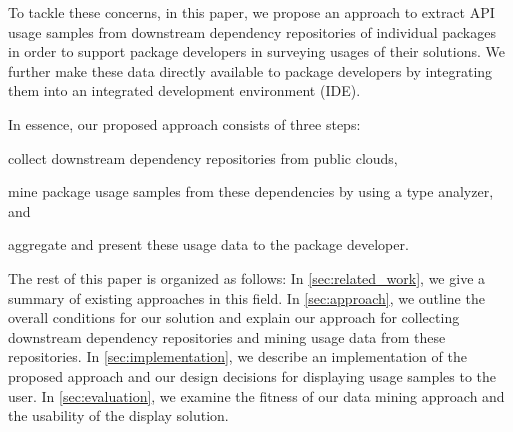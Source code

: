 To tackle these concerns, in this paper, we propose an approach to extract API usage samples from downstream dependency repositories of individual packages in order to support package developers in surveying usages of their solutions.
We further make these data directly available to package developers by integrating them into an integrated development environment (IDE).

In essence, our proposed approach consists of three steps:
\begin{enumerate*}[label=(\roman*)]
	\item collect downstream dependency repositories from public clouds,
	\item mine package usage samples from these dependencies by using a type analyzer,
	and \item aggregate and present these usage data to the package developer.
\end{enumerate*}

The rest of this paper is organized as follows:
In \cref{sec:related_work}, we give a summary of existing approaches in this field.
In \cref{sec:approach}, we outline the overall conditions for our solution and explain our approach for collecting downstream dependency repositories and mining usage data from these repositories.
In \cref{sec:implementation}, we describe an implementation of the proposed approach and our design decisions for displaying usage samples to the user.
In \cref{sec:evaluation}, we examine the fitness of our data mining approach and the usability of the display solution.
